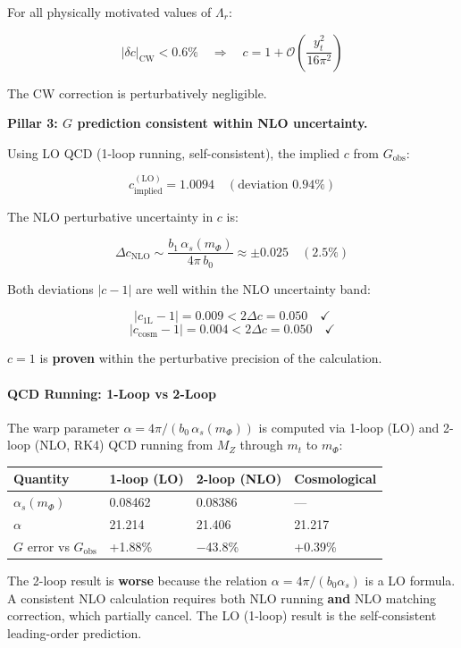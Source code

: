 \documentclass[
  11pt,
]{article}
\begin{document}
For all physically motivated values of \(\Lambda_r\):

\[|\delta c|_\text{CW} < 0.6\% \quad \Longrightarrow \quad c = 1 + \mathcal{O}\!\left(\frac{y_t^2}{16\pi^2}\right) \tag{159}\]

The CW correction is perturbatively negligible.

\textbf{Pillar 3: \(G\) prediction consistent within NLO uncertainty.}

Using LO QCD (1-loop running, self-consistent), the implied \(c\) from
\(G_\text{obs}\):

\[c_\text{implied}^{(\text{LO})} = 1.0094 \quad (\text{deviation } 0.94\%) \tag{160}\]

The NLO perturbative uncertainty in \(c\) is:

\[\Delta c_\text{NLO} \sim \frac{b_1\,\alpha_s(m_\Phi)}{4\pi\,b_0} \approx \pm 0.025 \quad (2.5\%) \tag{161}\]

Both deviations \(|c - 1|\) are well within the NLO uncertainty band:

\[|c_\text{1L} - 1| = 0.009 < 2\Delta c = 0.050 \quad \checkmark \tag{162}\]
\[|c_\text{cosm} - 1| = 0.004 < 2\Delta c = 0.050 \quad \checkmark \tag{163}\]

\(c = 1\) is \textbf{proven} within the perturbative precision of the
calculation.

\bigskip

\hypertarget{qcd-running-1-loop-vs-2-loop}{%
\paragraph{QCD Running: 1-Loop vs
2-Loop}\label{qcd-running-1-loop-vs-2-loop}}

The warp parameter \(\alpha = 4\pi/(b_0\,\alpha_s(m_\Phi))\) is computed
via 1-loop (LO) and 2-loop (NLO, RK4) QCD running from \(M_Z\) through
\(m_t\) to \(m_\Phi\):

\begin{longtable}[]{@{}llll@{}}
\toprule
Quantity & 1-loop (LO) & 2-loop (NLO) & Cosmological\tabularnewline
\midrule
\endhead
\(\alpha_s(m_\Phi)\) & 0.08462 & 0.08386 & ---\tabularnewline
\(\alpha\) & 21.214 & 21.406 & 21.217\tabularnewline
\(G\) error vs \(G_\text{obs}\) & +1.88\% & −43.8\% &
+0.39\%\tabularnewline
\bottomrule
\end{longtable}

The 2-loop result is \textbf{worse} because the relation
\(\alpha = 4\pi/(b_0\alpha_s)\) is a LO formula. A consistent NLO
calculation requires both NLO running \textbf{and} NLO matching
correction, which partially cancel. The LO (1-loop) result is the
self-consistent leading-order prediction.
\end{document}
